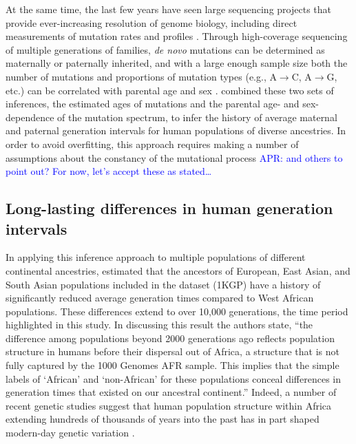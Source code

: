 \documentclass[]{article}
\newcommand{\aprcomment}[1]{{\textcolor{blue}{APR: #1}}}
\begin{document}
At the same time, the last few years have seen large sequencing projects that
provide ever-increasing resolution of genome biology, including direct
measurements of mutation rates and profiles
\citep{jonsson2017parental,halldorsson2019characterizing}. Through
high-coverage sequencing of multiple generations of families, \emph{de novo}
mutations can be determined as maternally or paternally inherited, and with a
large enough sample size both the number of mutations and proportions of
mutation types (e.g., A$\rightarrow$C, A$\rightarrow$G, etc.) can be correlated
with parental age and sex \citep{jonsson2017parental}. \citet{wang2023human}
combined these two sets of inferences, the estimated ages of mutations and the
parental age- and sex-dependence of the mutation spectrum, to infer the history
of average maternal and paternal generation intervals for human populations of
diverse ancestries. In order to avoid overfitting, this approach requires
making a number of assumptions about the constancy of the mutational process
\cite{harris,dewitt} \aprcomment{and others to point out? For now, let's accept
these as stated\ldots}

\subsection*{Long-lasting differences in human generation intervals}

In applying this inference approach to multiple populations of different
continental ancestries, \citet{wang2023human} estimated that the ancestors of
European, East Asian, and South Asian populations included in the
\citet{1000genomes2015} dataset (1KGP) have a history of significantly reduced
average generation times compared to West African populations. These
differences extend to over 10,000 generations, the time period highlighted in
this study. In discussing this result the authors state, ``the difference
among populations beyond 2000 generations ago reflects population structure in
humans before their dispersal out of Africa, a structure that is not fully
captured by the 1000 Genomes AFR sample. This implies that the simple labels
of `African' and `non-African' for these populations conceal differences in
generation times that existed on our ancestral continent.'' Indeed, a number of
recent genetic studies suggest that human population structure within Africa
extending hundreds of thousands of years into the past has in part shaped
modern-day genetic variation
\citep{plagnol2006possible,hammer2011genetic,hsieh2016model,hey2018phylogeny,
ragsdale2019models,durvasula2020recovering,lorente2019whole}.
\end{document}
